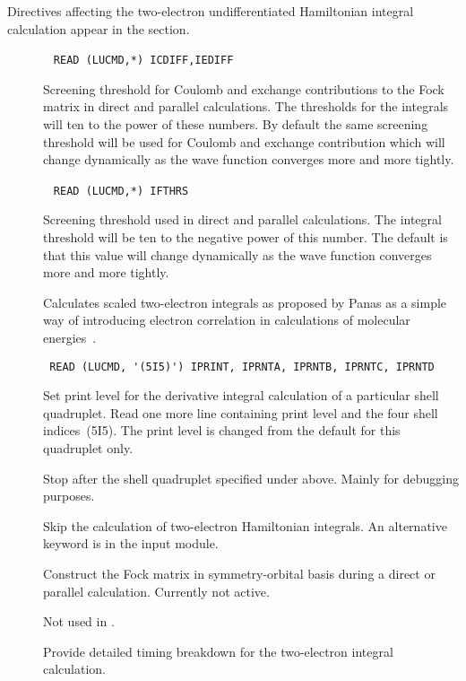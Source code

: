 Directives affecting the two-electron
undifferentiated Hamiltonian
integral calculation appear in the  section.
\begin{description}
\item[]\verb| |\newline
\verb|READ (LUCMD,*) ICDIFF,IEDIFF|

Screening threshold for Coulomb and exchange
contributions to the Fock
matrix in direct and parallel calculations. The thresholds for the
integrals will ten to the power of these numbers. By default the same
screening threshold will be used for Coulomb and exchange
contribution which will change dynamically as the wave function
converges more and more tightly.

\item[]\verb| |\newline
\verb|READ (LUCMD,*) IFTHRS|

Screening threshold used in direct and
parallel calculations. The integral threshold will be ten to the
negative power of this number. The default is that this value will change dynamically as the wave function converges more and more tightly.

\item[] Calculates scaled two-electron integrals as
proposed by Panas as a simple way of introducing electron
correlation in calculations of molecular energies~\cite{ipcpl245}.

\item[]\verb| |\newline
\verb|READ (LUCMD, '(5I5)') IPRINT, IPRNTA, IPRNTB, IPRNTC, IPRNTD|

Set print level for the derivative integral calculation of a particular shell
quadruplet.  Read one more line containing print level and the four
shell indices~(5I5).  The print level is changed from the default
for this quadruplet only.

\item[] Stop after the shell quadruplet specified
under  above. Mainly for debugging purposes.

\item[] Skip the calculation of two-electron Hamiltonian
integrals. An alternative keyword is  in the 
input module.

\item[] Construct the Fock matrix in symmetry-orbital
basis during a direct or parallel calculation. Currently not active.

\item[] Not used in \siraba .

\item[] Provide detailed timing breakdown for the
two-electron integral calculation.
\end{description}


